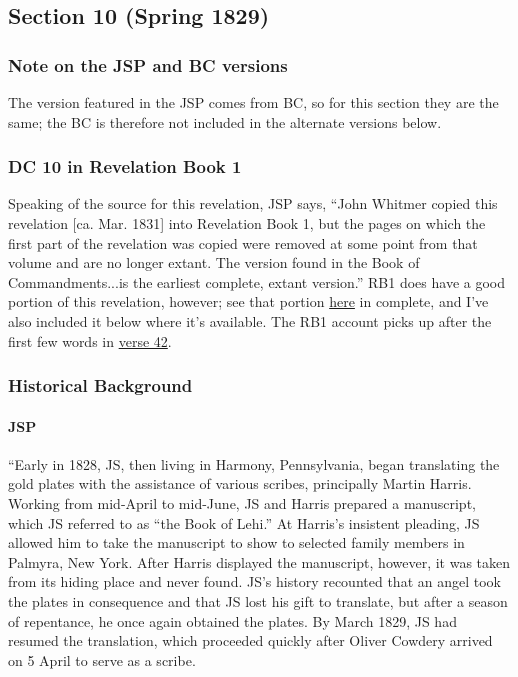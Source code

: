 \subsection{Section 10 (Spring 1829)}
	\label{DC10}
	
	\subsubsection{Note on the JSP and BC versions}
	
		The version featured in the JSP comes from BC, so for this section they are the same; the BC is therefore not included in the alternate versions below.
		
	\subsubsection{DC 10 in Revelation Book 1}
	
		Speaking of the source for this revelation, JSP says, ``John Whitmer copied this revelation [ca. Mar. 1831] into Revelation Book 1, but the pages on which the first part of the revelation was copied were removed at some point from that volume and are no longer extant. The version found in the Book of Commandments...is the earliest complete, extant version.'' RB1 does have a good portion of this revelation, however; see that portion \hyperref[EXSS-DC10-RB1]{here} in complete, and I've also included it below where it's available. The RB1 account picks up after the first few words in \hyperref[DC10-42]{verse 42}.
	
	\subsubsection{Historical Background}
		\label{DC10-HB}
		
		\paragraph{JSP}
		
			``Early in 1828, JS, then living in Harmony, Pennsylvania, began translating the gold plates with the assistance of various scribes, principally Martin Harris. Working from mid-April to mid-June, JS and Harris prepared a manuscript, which JS referred to as ``the Book of Lehi.'' At Harris's insistent pleading, JS allowed him to take the manuscript to show to selected family members in Palmyra, New York. After Harris displayed the manuscript, however, it was taken from its hiding place and never found. JS's history recounted that an angel took the plates in consequence and that JS lost his gift to translate, but after a season of repentance, he once again obtained the plates. By March 1829, JS had resumed the translation, which proceeded quickly after Oliver Cowdery arrived on 5 April to serve as a scribe.

